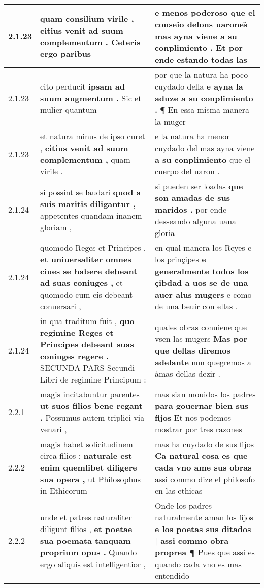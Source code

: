 \begin{tabular}{|p{1cm}|p{6.5cm}|p{6.5cm}|}
2.1.23 & quam consilium virile , \textbf{ citius venit ad suum complementum . } Ceteris ergo paribus & e menos poderoso que el conseio delons \textbf{ uarones̃ mas ayna viene a su conplimiento . } Et por ende estando todas las \\\hline
2.1.23 & cito perducit \textbf{ ipsam ad suum augmentum . } Sic et mulier quantum & por que la natura ha poco cuydado della \textbf{ e ayna la aduze a su conplimiento . } ¶ En essa misma manera la muger \\\hline
2.1.23 & et natura minus de ipso curet , \textbf{ citius venit ad suum complementum , } quam virile . & e la natura ha menor cuydado del mas ayna viene \textbf{ a su conplimiento } que el cuerpo del uaron . \\\hline
2.1.24 & si possint se laudari \textbf{ quod a suis maritis diligantur , } appetentes quandam inanem gloriam , & si pueden ser loadas \textbf{ que son amadas de sus maridos . } por ende desseando alguna uana gloria \\\hline
2.1.24 & quomodo Reges et Principes , \textbf{ et uniuersaliter omnes ciues se habere debeant ad suas coniuges , } et quomodo cum eis debeant conuersari , & en qual manera los Reyes e los prinçipes \textbf{ e generalmente todos los çibdad a uos se de una auer alus mugers } e como de una beuir con ellas . \\\hline
2.1.24 & in qua traditum fuit , \textbf{ quo regimine Reges et Principes debeant suas coniuges regere . } SECUNDA PARS Secundi Libri de regimine Principum : & quales obras conuiene que vsen las mugers \textbf{ Mas por que dellas diremos adelante } non quegremos a àmas dellas dezir . \\\hline
2.2.1 & magis incitabuntur parentes \textbf{ ut suos filios bene regant . } Possumus autem triplici via venari , & mas sian mouidos los padres \textbf{ para gouernar bien sus fijos } Et nos podemos mostrar por tres razones \\\hline
2.2.2 & magis habet solicitudinem circa filios : \textbf{ naturale est enim quemlibet diligere sua opera , } ut Philosophus in Ethicorum & mas ha cuydado de sus fijos \textbf{ Ca natural cosa es que cada vno ame sus obras } assi commo dize el philosofo en las ethicas \\\hline
2.2.2 & unde et patres naturaliter diligunt filios , \textbf{ et poetae sua poemata tanquam proprium opus . } Quando ergo aliquis est intelligentior , & Onde los padres naturalmente aman los fijos \textbf{ e los poetas sus ditados | assi commo obra proprea ¶ } Pues que assi es quando cada vno es mas entendido \\\hline

\end{tabular}
